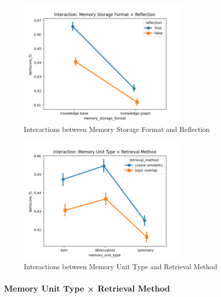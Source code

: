 \begin{figure}[p]
\centering
\includegraphics[width=0.75\textwidth]{charts/interaction_memory_storage_format_x_reflection.png}
\caption{Interactions between Memory Storage Format and Reflection}
\label{fig:interaction_memory_storage_format_x_reflection}
\end{figure}

\begin{figure}[p]
\centering
\includegraphics[width=0.75\textwidth]{charts/interaction_memory_unit_type_x_retrieval_method.png}
\caption{Interactions between Memory Unit Type and Retrieval Method}
\label{fig:interaction_memory_unit_type_x_retrieval_method}
\end{figure}


\subsubsection{Memory Unit Type × Retrieval Method}

